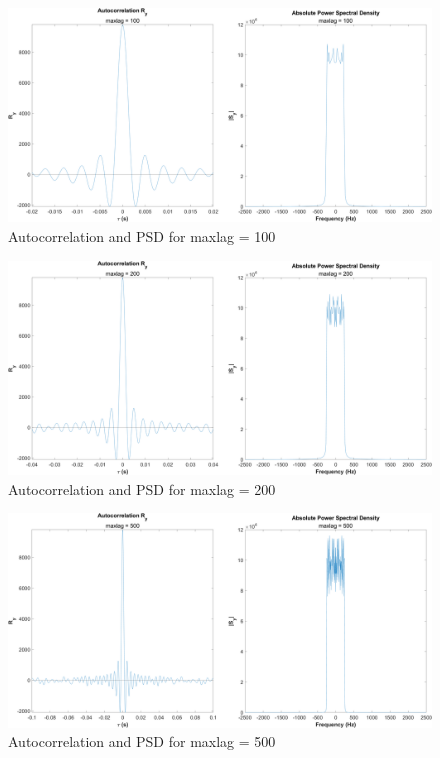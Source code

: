 \documentclass[12pt]{article}
\begin{document}

\begin{figure}[h]
	\centering
	\includegraphics[width=\textwidth]{exp1_maxlag_100}
	\caption{\label{fig:exp1_maxlag100}Autocorrelation and PSD for maxlag = 100}
\end{figure}

\begin{figure}[h]
	\centering
	\includegraphics[width=\textwidth]{exp1_maxlag_200}
	\caption{\label{fig:exp1_maxlag200}Autocorrelation and PSD for maxlag = 200}
\end{figure}

\begin{figure}[h]
	\centering
	\includegraphics[width=\textwidth]{exp1_maxlag_500}
	\caption{\label{fig:exp1_maxlag500}Autocorrelation and PSD for maxlag = 500}
\end{figure}
\end{document}
